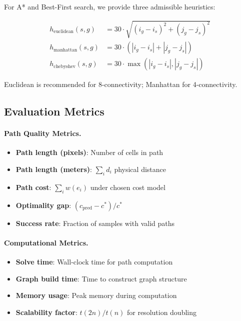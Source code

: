 \documentclass{article}
\begin{document}
For A* and Best-First search, we provide three admissible heuristics:

\begin{align}
h_{\text{euclidean}}(s, g) &= 30 \cdot \sqrt{(i_g - i_s)^2 + (j_g - j_s)^2} \\
h_{\text{manhattan}}(s, g) &= 30 \cdot (|i_g - i_s| + |j_g - j_s|) \\
h_{\text{chebyshev}}(s, g) &= 30 \cdot \max(|i_g - i_s|, |j_g - j_s|)
\end{align}

Euclidean is recommended for 8-connectivity; Manhattan for 4-connectivity.

\subsection{Evaluation Metrics}

\paragraph{Path Quality Metrics.}
\begin{itemize}[noitemsep]
    \item \textbf{Path length (pixels)}: Number of cells in path
    \item \textbf{Path length (meters)}: $\sum_i d_i$ physical distance
    \item \textbf{Path cost}: $\sum_i w(e_i)$ under chosen cost model
    \item \textbf{Optimality gap}: $(c_{\text{pred}} - c^*) / c^*$
    \item \textbf{Success rate}: Fraction of samples with valid paths
\end{itemize}

\paragraph{Computational Metrics.}
\begin{itemize}[noitemsep]
    \item \textbf{Solve time}: Wall-clock time for path computation
    \item \textbf{Graph build time}: Time to construct graph structure
    \item \textbf{Memory usage}: Peak memory during computation
    \item \textbf{Scalability factor}: $t(2n) / t(n)$ for resolution doubling
\end{itemize}
\end{document}
